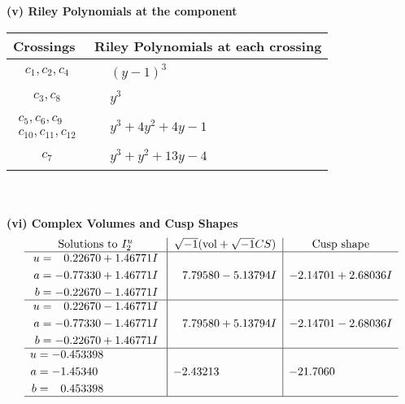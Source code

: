 \documentclass[1p]{elsarticle_modified}
\theoremstyle{definition}
\newcommand{\I}{\sqrt{-1}}
\begin{document}
\flushleft \textbf{(v) Riley Polynomials at the component}\newline \\
\begin{tabular}{m{50pt}|m{274pt}}
Crossings & \hspace{64pt}Riley Polynomials at each crossing \\
\hline $$\begin{aligned}c_{1},c_{2},c_{4}\end{aligned}$$&$\begin{aligned}
&(y-1)^3
\end{aligned}$\\
\hline $$\begin{aligned}c_{3},c_{8}\end{aligned}$$&$\begin{aligned}
&y^3
\end{aligned}$\\
\hline $$\begin{aligned}c_{5},c_{6},c_{9}\\c_{10},c_{11},c_{12}\end{aligned}$$&$\begin{aligned}
&y^3+4 y^2+4 y-1
\end{aligned}$\\
\hline $$\begin{aligned}c_{7}\end{aligned}$$&$\begin{aligned}
&y^3+y^2+13 y-4
\end{aligned}$\\
\hline
\end{tabular}\\~\\
\newpage\flushleft \textbf{(vi) Complex Volumes and Cusp Shapes}
$$\begin{array}{c|c|c}  
\text{Solutions to }I^u_{2}& \I (\text{vol} + \sqrt{-1}CS) & \text{Cusp shape}\\
 \hline 
\begin{aligned}
u &= \phantom{-}0.22670 + 1.46771 I \\
a &= -0.77330 + 1.46771 I \\
b &= -0.22670 - 1.46771 I\end{aligned}
 & \phantom{-}7.79580 - 5.13794 I & -2.14701 + 2.68036 I \\ \hline\begin{aligned}
u &= \phantom{-}0.22670 - 1.46771 I \\
a &= -0.77330 - 1.46771 I \\
b &= -0.22670 + 1.46771 I\end{aligned}
 & \phantom{-}7.79580 + 5.13794 I & -2.14701 - 2.68036 I \\ \hline\begin{aligned}
u &= -0.453398\phantom{ +0.000000I} \\
a &= -1.45340\phantom{ +0.000000I} \\
b &= \phantom{-}0.453398\phantom{ +0.000000I}\end{aligned}
 & -2.43213\phantom{ +0.000000I} & -21.7060\phantom{ +0.000000I}\\
 \hline 
 \end{array}$$\newpage\newpage\renewcommand{\arraystretch}{1}
\end{document}
